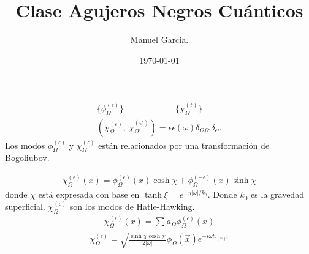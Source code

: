 \documentclass{article}
\title{Clase Agujeros Negros Cuánticos }
\author{Manuel Garcia.}
\date{\today}
\begin{document}
\maketitle

\section{}
\begin{gather*}
  \{\phi _{\Omega} ^ {(\epsilon)} \} \qquad \qquad \qquad \{\chi _{\Omega} ^ {(t)} \} \\
  (\chi _{\Omega }  ^ {(\epsilon)}, \ \chi _{\Omega'} ^ {(\epsilon' )}) = \epsilon \epsilon (\omega) \delta _{\Omega \Omega' } \delta _{\epsilon\epsilon' } 
\end{gather*}
Los modos $ \phi _{\Omega} ^ {(\epsilon)} $ y $ \chi _{\Omega} ^ {(\epsilon)} $ están relacionados por una transformación de Bogoliubov. 

\begin{gather*}
   \chi _{\Omega} ^ {(\epsilon)}(x) = \phi _{\Omega} ^ {(\epsilon)}(x) \cosh \chi + \phi _{\Omega} ^ {(-\epsilon)}(x) \sinh \chi 
\end{gather*}
donde $ \chi  $ está expresada con base en $ \tanh \xi = e ^ {- \pi \left|\omega\right|/k_0 } $. Donde $ k_0  $ es la gravedad superficial. $ \chi _{\Omega} ^ {(\epsilon)} $ son los modos de Hatle-Hawking.
\begin{gather*}
  \chi _{\Omega } ^ {(\epsilon)} (x) = \displaystyle\sum_{}^{} a _{\Omega } \phi _{\Omega } ^ {(\epsilon)}(x)
\end{gather*}
\begin{gather*}
  \chi _{\Omega }  ^ {(\epsilon)} = \sqrt{\frac{\sinh \chi \cosh \chi }{2 \left|\omega\right|}} \phi _{\Omega } (\vec x) e ^ {- i\omega t _{\epsilon(\omega) \epsilon}} 
\end{gather*}
\end{document}
